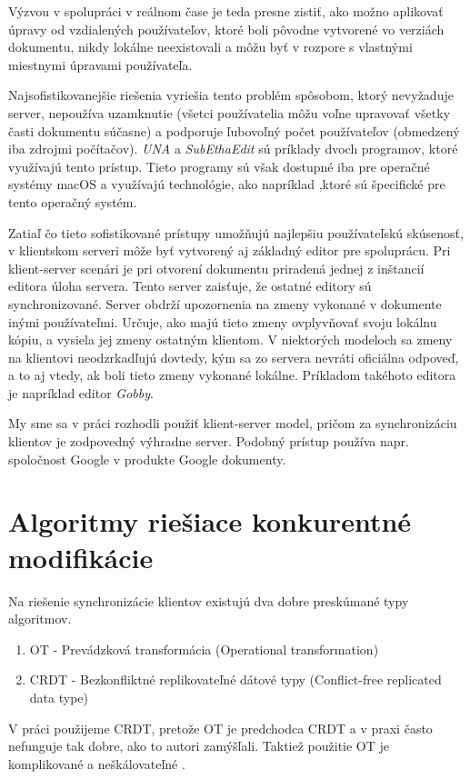 Výzvou v spolupráci v reálnom čase je teda presne zistiť, ako možno aplikovať úpravy
od vzdialených používateľov, ktoré boli pôvodne vytvorené vo verziách dokumentu,
nikdy lokálne neexistovali a môžu byť v rozpore s vlastnými miestnymi úpravami používateľa.

Najsofistikovanejšie riešenia vyriešia tento problém spôsobom, ktorý nevyžaduje server,
nepoužíva uzamknutie (všetci používatelia môžu voľne upravovať všetky časti dokumentu súčasne) 
a podporuje ľubovoľný počet používateľov (obmedzený iba zdrojmi počítačov). 
\textit{UNA} a \textit{SubEthaEdit} sú príklady dvoch programov, ktoré využívajú tento prístup.
Tieto programy sú však dostupné iba pre operačné systémy macOS a využívajú technológie,
ako napríklad \cite{bonjour},ktoré sú špecifické pre tento operačný systém.

Zatiaľ čo tieto sofistikované prístupy umožňujú najlepšiu používateľskú skúsenosť,
v klientskom serveri môže byť vytvorený aj základný editor pre spoluprácu. Pri klient-server 
scenári je pri otvorení dokumentu priradená jednej z inštancií editora úloha servera.
Tento server zaisťuje, že ostatné editory sú synchronizované. Server obdrží upozornenia
na zmeny vykonané v dokumente inými používateľmi. 
Určuje, ako majú tieto zmeny ovplyvňovať svoju lokálnu kópiu, a vysiela jej zmeny ostatným klientom.
V niektorých modeloch sa zmeny na klientovi neodzrkadľujú dovtedy,
kým sa zo servera nevráti oficiálna odpoveď, a to aj vtedy, ak boli tieto zmeny vykonané lokálne.
Príkladom takéhoto editora je napríklad editor \textit{Gobby}.

My sme sa v práci rozhodli použiť klient-server model, pričom za synchronizáciu klientov
je zodpovedný výhradne server. Podobný prístup používa napr. spoločnost Google v produkte 
Google dokumenty.

\section{Algoritmy riešiace konkurentné modifikácie}
Na riešenie synchronizácie klientov existujú dva dobre preskúmané typy algoritmov.
\begin{enumerate}
  \item OT - Prevádzková transformácia (Operational transformation)
  \item CRDT - Bezkonfliktné replikovateľné dátové typy (Conflict-free replicated data type)
\end{enumerate}

V práci použijeme CRDT, pretože OT je predchodca CRDT a v praxi často nefunguje tak dobre,
ako to autori zamýšľali. Taktiež použitie OT je komplikované a neškálovateľné \cite{ot_nonscalable}.
